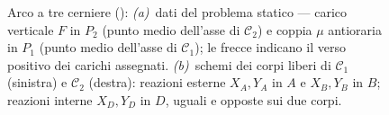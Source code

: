 \begin{figure}[ht]
		\caption{Arco a tre cerniere
			():
			\emph{(a)}~dati del problema statico ---
			carico verticale $F$ in $P_2$ (punto medio
			dell'asse di $\mathcal{C}_2$) e coppia $\mu$
			antioraria in $P_1$ (punto medio dell'asse
			di $\mathcal{C}_1$); le frecce indicano il
			verso positivo dei carichi assegnati.
			\emph{(b)}~schemi dei corpi liberi di
			$\mathcal{C}_1$ (sinistra) e $\mathcal{C}_2$
			(destra): reazioni esterne $X_A, Y_A$ in $A$
			e $X_B, Y_B$ in $B$; reazioni interne $X_D, Y_D$
			in $D$, uguali e opposte sui due corpi.}
		\label{fig:arco_statico}
	\end{figure}
